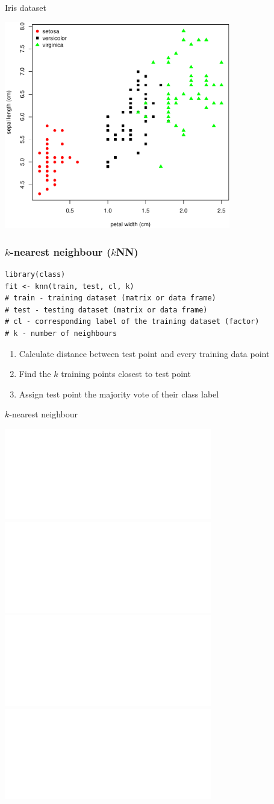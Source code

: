 \documentclass[pdf]{beamer}
\begin{document}
\begin{frame}{Iris dataset}
\begin{center}
	\includegraphics[width=0.74\textwidth]{irisPlot.pdf}
\end{center}
\end{frame}
\begin{frame}[fragile]
\frametitle{$k$-nearest neighbour ($k$NN)}
\begin{lstlisting}[style=RCode]
library(class)
fit <- knn(train, test, cl, k)
# train - training dataset (matrix or data frame)
# test - testing dataset (matrix or data frame)
# cl - corresponding label of the training dataset (factor)
# k - number of neighbours
\end{lstlisting}
\begin{enumerate}\addtolength{\itemsep}{0.5\baselineskip}
	\item<2-> Calculate distance between test point and every training data point 
	\item<3-> Find the $k$ training points closest to test point 
	\item<4-> Assign test point the majority vote of their class label
\end{enumerate}
\end{frame}
\begin{frame}{$k$-nearest neighbour}
	\begin{center}
		\includegraphics<1>[width=0.68\textwidth]{1nearestNeighbour.pdf}
		\includegraphics<2>[width=0.68\textwidth]{5nearestNeighbour.pdf}
		\includegraphics<3>[width=0.68\textwidth]{15nearestNeighbour.pdf}
		\includegraphics<4>[width=0.68\textwidth]{30nearestNeighbour.pdf}
	\end{center}
\end{frame}
\end{document}
